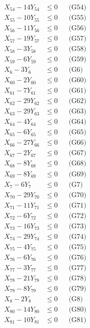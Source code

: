 \documentclass[a4paper,10pt]{article}
\begin{document}
{\begin{align}
X_{54} - 14Y_{54} &\leq 0 && \text{(G54)} \\
X_{55} - 10Y_{55} &\leq 0 && \text{(G55)} \\
X_{56} - 11Y_{56} &\leq 0 && \text{(G56)} \\
X_{57} - 19Y_{57} &\leq 0 && \text{(G57)} \\
X_{58} - 3Y_{58} &\leq 0 && \text{(G58)} \\
X_{59} - 6Y_{59} &\leq 0 && \text{(G59)} \\
X_{6} - 3Y_{6} &\leq 0 && \text{(G6)} \\
X_{60} - 2Y_{60} &\leq 0 && \text{(G60)} \\
X_{61} - 7Y_{61} &\leq 0 && \text{(G61)} \\
X_{62} - 29Y_{62} &\leq 0 && \text{(G62)} \\
\allowbreak
X_{63} - 29Y_{63} &\leq 0 && \text{(G63)} \\
X_{64} - 4Y_{64} &\leq 0 && \text{(G64)} \\
X_{65} - 6Y_{65} &\leq 0 && \text{(G65)} \\
X_{66} - 27Y_{66} &\leq 0 && \text{(G66)} \\
X_{67} - 2Y_{67} &\leq 0 && \text{(G67)} \\
X_{68} - 8Y_{68} &\leq 0 && \text{(G68)} \\
X_{69} - 8Y_{69} &\leq 0 && \text{(G69)} \\
X_{7} - 6Y_{7} &\leq 0 && \text{(G7)} \\
X_{70} - 29Y_{70} &\leq 0 && \text{(G70)} \\
X_{71} - 11Y_{71} &\leq 0 && \text{(G71)} \\
X_{72} - 6Y_{72} &\leq 0 && \text{(G72)} \\
X_{73} - 16Y_{73} &\leq 0 && \text{(G73)} \\
X_{74} - 29Y_{74} &\leq 0 && \text{(G74)} \\
X_{75} - 4Y_{75} &\leq 0 && \text{(G75)} \\
X_{76} - 6Y_{76} &\leq 0 && \text{(G76)} \\
X_{77} - 3Y_{77} &\leq 0 && \text{(G77)} \\
X_{78} - 21Y_{78} &\leq 0 && \text{(G78)} \\
X_{79} - 8Y_{79} &\leq 0 && \text{(G79)} \\
X_{8} - 2Y_{8} &\leq 0 && \text{(G8)} \\
X_{80} - 14Y_{80} &\leq 0 && \text{(G80)} \\
\allowbreak
X_{81} - 10Y_{81} &\leq 0 && \text{(G81)} \\

\end{align}}
\end{document}
